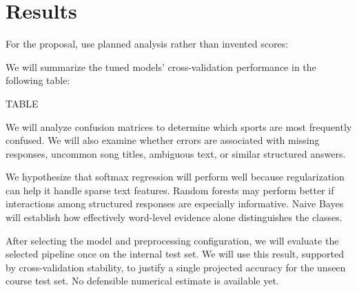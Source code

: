 \documentclass[12pt]{article}
\begin{document}
\section{Results}\label{sec:results}
For the proposal, use planned analysis rather than invented scores:

We will summarize the tuned models' cross-validation performance in the following table:

TABLE

We will analyze confusion matrices to determine which sports are most frequently confused. We will also examine whether errors are associated with missing responses, uncommon song titles, ambiguous text, or similar structured answers.

We hypothesize that softmax regression will perform well because regularization can help it handle sparse text features. Random forests may perform better if interactions among structured responses are especially informative. Naive Bayes will establish how effectively word-level evidence alone distinguishes the classes.

After selecting the model and preprocessing configuration, we will evaluate the selected pipeline once on the internal test set. We will use this result, supported by cross-validation stability, to justify a single projected accuracy for the unseen course test set. No defensible numerical estimate is available yet.

\end{document}
